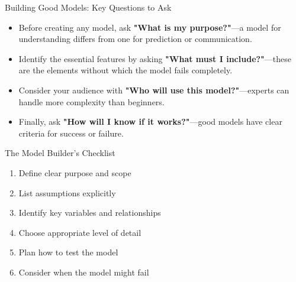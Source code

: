 \documentclass{beamer}
\begin{document}
	\begin{frame}{Building Good Models: Key Questions to Ask}
		\begin{itemize}
			\item Before creating any model, ask \textbf{"What is my purpose?"}—a model for understanding differs from one for prediction or communication.
			\item Identify the essential features by asking \textbf{"What must I include?"}—these are the elements without which the model fails completely.
			\item Consider your audience with \textbf{"Who will use this model?"}—experts can handle more complexity than beginners.
			\item Finally, ask \textbf{"How will I know if it works?"}—good models have clear criteria for success or failure.
		\end{itemize}
		
		\begin{block}{The Model Builder's Checklist}
			\scriptsize
			\begin{enumerate}
				\item Define clear purpose and scope
				\item List assumptions explicitly  
				\item Identify key variables and relationships
				\item Choose appropriate level of detail
				\item Plan how to test the model
				\item Consider when the model might fail
			\end{enumerate}
		\end{block}
	\end{frame}
	
\end{document}
